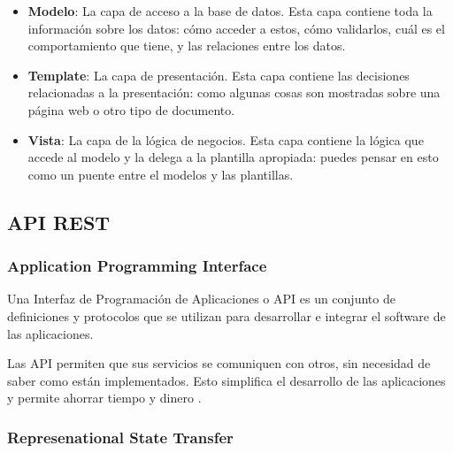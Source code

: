 \begin{itemize}
    \item \textbf{Modelo}: La capa de acceso a la base de datos. Esta capa contiene toda la información sobre los datos: cómo acceder a estos, cómo validarlos, cuál es el comportamiento que tiene, y las relaciones entre los datos.
    \item \textbf{Template}: La capa de presentación. Esta capa contiene las decisiones relacionadas a la presentación: como algunas cosas son mostradas sobre una página web o otro tipo de documento.
    \item \textbf{Vista}: La capa de la lógica de negocios. Esta capa contiene la lógica que accede al modelo y la delega a la plantilla apropiada: puedes pensar en esto como un puente entre el modelos y las plantillas.
\end{itemize}

\subsection{API REST}
\subsubsection{Application Programming Interface}
Una Interfaz de Programación de Aplicaciones o API es un conjunto de definiciones y protocolos que se utilizan para desarrollar e integrar el software de las aplicaciones.

Las API permiten que sus servicios se comuniquen con otros, sin necesidad de saber como están implementados. Esto simplifica el desarrollo de las aplicaciones y permite ahorrar tiempo y dinero \cite{apiArticle}.
\subsubsection{Represenational State Transfer}


